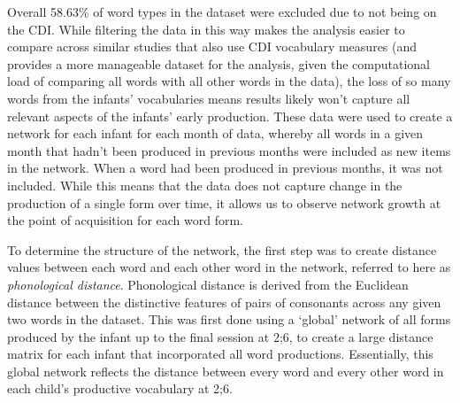 \documentclass[
  man]{apa6}
\begin{document}
Overall 58.63\% of word types in the dataset were excluded due to not being on the CDI. While filtering the data in this way makes the analysis easier to compare across similar studies that also use CDI vocabulary measures (and provides a more manageable dataset for the analysis, given the computational load of comparing all words with all other words in the data), the loss of so many words from the infants' vocabularies means results likely won't capture all relevant aspects of the infants' early production. These data were used to create a network for each infant for each month of data, whereby all words in a given month that hadn't been produced in previous months were included as new items in the network. When a word had been produced in previous months, it was not included. While this means that the data does not capture change in the production of a single form over time, it allows us to observe network growth at the point of acquisition for each word form.

To determine the structure of the network, the first step was to create distance values between each word and each other word in the network, referred to here as \emph{phonological distance}. Phonological distance is derived from the Euclidean distance between the distinctive features of pairs of consonants across any given two words in the dataset. This was first done using a `global' network of all forms produced by the infant up to the final session at 2;6, to create a large distance matrix for each infant that incorporated all word productions. Essentially, this global network reflects the distance between every word and every other word in each child's productive vocabulary at 2;6.
\end{document}
